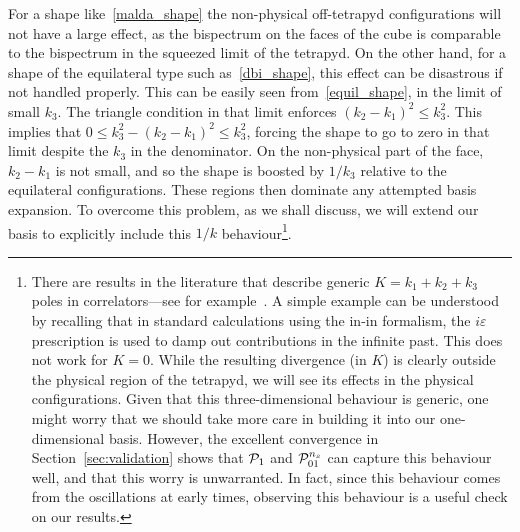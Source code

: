 For a shape like~\eqref{malda_shape} the non-physical off-tetrapyd configurations
will not have a large effect, as the bispectrum on the faces of the cube is comparable
to the bispectrum in the squeezed limit of the tetrapyd.
On the other hand, for a shape of the equilateral type such as~\eqref{dbi_shape},
this effect can be disastrous if not handled properly.
This can be easily seen from~\eqref{equil_shape}, in the limit of small $k_3$.
The triangle condition in that limit enforces ${(k_2-k_1)^2\leq k^2_3}$.
This implies that ${0\leq k^2_3-(k_2-k_1)^2\leq k^2_3}$,
forcing the shape to go to zero in that limit despite the $k_3$
in the denominator.
On the non-physical part of the face, $k_2-k_1$ is not small,
and so the shape is boosted by $1/k_3$ relative to the equilateral configurations.
These regions then dominate any attempted basis expansion.
To overcome this problem, as we shall discuss, we will extend our basis to explicitly include this $1/k$ behaviour\footnote{
    There are results in the literature that describe
    generic $K=k_1+k_2+k_3$ poles
    in correlators---see for example~\cite{cosmo_bootstrap}.
    A simple example can be understood by recalling that
    in standard calculations using the in-in formalism, the $i\varepsilon$ prescription
    is used to damp out contributions in the infinite past.
    This does not work for $K=0$. While the resulting
    divergence (in $K$) is clearly outside the physical region of the tetrapyd,
    we will see its effects in the physical configurations.
    Given that this three-dimensional behaviour is generic, one might worry that we should
    take more care in building it into our one-dimensional basis.
    However, the excellent convergence in
    Section~\ref{sec:validation}
    shows that $\mathcal{P}_1$ and $\mathcal{P}^{n_s}_{01}$ can capture this behaviour well,
    and that this worry is unwarranted.
    In fact, since this behaviour comes from the oscillations
    at early times, observing this behaviour is a useful
    check on our results.%
}.

